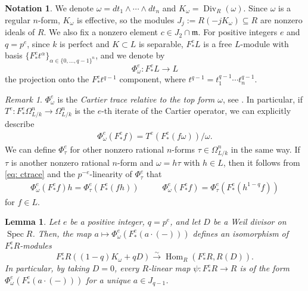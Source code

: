 \documentclass[11pt,leqno]{amsart}
\numberwithin{equation}{section}
\newtheorem{lemma}[theorem]{Lemma}
\theoremstyle{definition}
\newtheorem{notation}[theorem]{Notation}
\theoremstyle{remark}
\newtheorem{remark}[theorem]{Remark}
\newcommand{\Spec}{\operatorname{Spec}}
\newcommand{\lre}{\longrightarrow}
\newcommand{\Div}{\operatorname{Div}}
\providecommand{\frm}{}
\renewcommand{\frm}{\mathfrak{m}}
\DeclareMathOperator{\Hom}{Hom}
\begin{document}
\begin{notation} \label{not: conversesetup}
We denote $\omega = dt_1 \wedge \cdots \wedge dt_n$ and $K_\omega = \Div_R(\omega)$. Since $\omega$ is a regular $n$-form, $K_\omega$ is effective, so the modules $J_j := R(-jK_\omega) \subseteq R$ are nonzero ideals of $R$. We also fix a nonzero element $c \in J_2 \cap \frm$. For positive integers $e$ and $q = p^e$, since $k$ is perfect and $K \subset L$ is separable, $F^e_* L$ is a free $L$-module with basis $\{F^e_* t^\alpha\}_{\alpha \in \{0, \ldots, q-1\}^n}$, and we denote by $$\Phi^e_{\omega}: F^e_* L \lre L $$ the projection onto the $F^e_* t^{q - 1}$ component, where $t^{q-1} = t_1^{q-1} \cdots t_n^{q-1}$.
\end{notation}

\begin{remark} \label{rem: Cartiertrace}
$\Phi^e_\omega$ is the \textit{Cartier trace relative to the top form $\omega$}, see \cite[Lemma 1.3.6, Proposition 1.3.7, Remark 1.3.12]{BK05}. In particular, if $T^e: F^e_* \Omega^n_{L/k} \to \Omega^n_{L/k}$ is the $e$-th iterate of the Cartier operator, we can explicitly describe \begin{align}\label{eq: ctrace} \Phi^e_\omega(F^e_*f) = T^e(F^e_*(f \omega))/\omega.\end{align} We can define $\Phi^e_\tau$ for other nonzero rational $n$-forms $\tau \in \Omega^n_{L/k}$ in the same way. If $\tau$ is another nonzero rational $n$-form and $\omega = h\tau$ with $h \in L$, then it follows from \cref{eq: ctrace} and the $p^{-e}$-linearity of $\Phi^e_\tau$ that \begin{align} \label{eq: omegatotau} \Phi^e_\omega(F^e_* f) h = \Phi^e_\tau(F^e_* (fh)) \;\;\;\;\;\;\;\;\;\; \Phi^e_\omega(F^e_* f) = \Phi^e_\tau(F^e_* (h^{1 - q} f))\end{align} for $f \in L$.
\end{remark}



\begin{lemma} \label{cartiermaps}
Let $e$ be a positive integer, $q = p^e$, and let $D$ be a Weil divisor on $\Spec R$. Then, the map $a \mapsto \Phi^e_\omega(F^e_*(a \cdot (-)))$ defines an isomorphism of $F^e_*R$-modules $$F^e_*R((1 - q)K_\omega + qD) \stackrel{\sim}{\lre} \Hom_R(F^e_*R, R(D)).$$ In particular, by taking $D = 0$, every $R$-linear map $\psi: F^e_*R \to R$ is of the form $\Phi^e_\omega(F^e_*(a \cdot (-)))$ for a unique $a \in J_{q - 1}$. 
\end{lemma}
\end{document}
